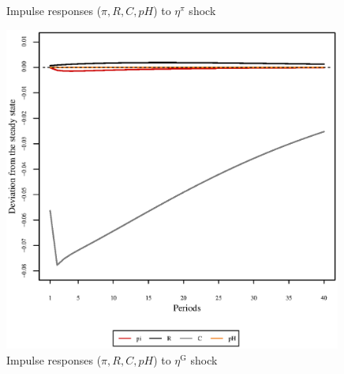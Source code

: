 \begin{figure}[h]
\begin{minipage}{0.5\textwidth}
\caption{Impulse responses ($\pi, R, C, {p\!H}$) to $\eta^{\pi}$ shock}
\end{minipage}
\end{figure}

\pagebreak

\begin{figure}[h]
\centering
\begin{minipage}{0.5\textwidth}
\vspace*{-3em}
\centering
\includegraphics[width=0.99\textwidth, scale=0.55]{plots/plot_25.eps}
\caption{Impulse responses ($\pi, R, C, {p\!H}$) to $\eta^{\mathrm{G}}$ shock}
\end{minipage}
\end{figure}
